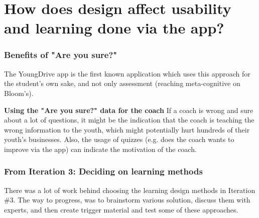 
\section{How does design affect usability and learning done via the app?}

  \subsubsection{Benefits of "Are you sure?"}

  The YoungDrive app is the first known application which uses this approach for the student's own sake, and not only assessment (reaching meta-cognitive on Bloom's).


  \textbf{Using the "Are you sure?" data for the coach}
  If a coach is wrong and sure about a lot of questions, it might be the indication that the coach is teaching the wrong information to the youth, which might potentially hurt hundreds of their youth's businesses. Also, the usage of quizzes (e.g. does the coach wants to improve via the app) can indicate the motivation of the coach.


  \subsubsection{From Iteration 3:  Deciding on learning methods}
  There was a lot of work behind choosing the learning design methods in Iteration \#3. The way to progress, was to brainstorm various solution, discuss them with experts, and then create trigger material and test some of these approaches.

